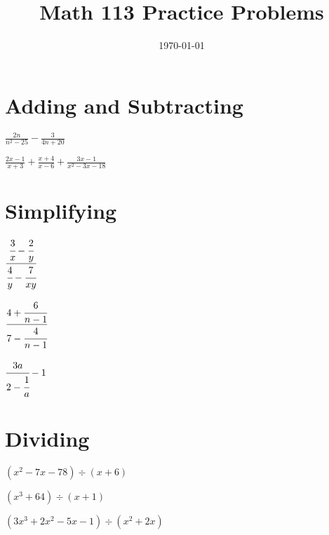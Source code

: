 \documentclass[fleqn,addpoints]{exam}
\title{Math 113 Practice Problems}
\author{}
\date{\today}
\begin{document}
\maketitle

\section{Adding and Subtracting}

\begin{questions}

\question \( \displaystyle \frac{2n}{n^2-25} - \frac{3}{4n + 20} \)
\vspace{1 in}

\question \( \displaystyle \frac{2x - 1}{x+3} + \frac{x+4}{x-6} + \frac{3x-1}{x^2-3x-18} \)
\vspace{1 in}

\section{Simplifying}

\question \( \displaystyle \cfrac{\cfrac{3}{x} - \cfrac{2}{y}}{\cfrac{4}{y} - \cfrac{7}{xy}} \)
\vspace{1 in}

\question \( \displaystyle \cfrac{4 + \cfrac{6}{n-1}}{7 - \cfrac{4}{n-1}} \)
\vspace{1 in}

\question \( \displaystyle \cfrac{3a}{2 - \cfrac{1}{a}} - 1 \) 
\vspace{1 in}


\section{Dividing}

\question \( (x^2-7x-78) \div (x+6) \)
\vspace{2 in}

\question \( (x^3+64) \div (x+1) \)
\vspace{2 in}

\question \( (3x^3+2x^2-5x-1) \div (x^2+2x) \)
\vspace{2 in}

\end{questions}
\end{document}
